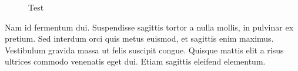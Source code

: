 \documentclass[sigconf]{acmart}
\begin{document}
\begin{figure}[h]
	\centering
	\caption{Test}
\end{figure}

Nam id fermentum dui. Suspendisse sagittis tortor a nulla mollis, in
pulvinar ex pretium. Sed interdum orci quis metus euismod, et sagittis
enim maximus. Vestibulum gravida massa ut felis suscipit
congue. Quisque mattis elit a risus ultrices commodo venenatis eget
dui. Etiam sagittis eleifend elementum.
\end{document}
